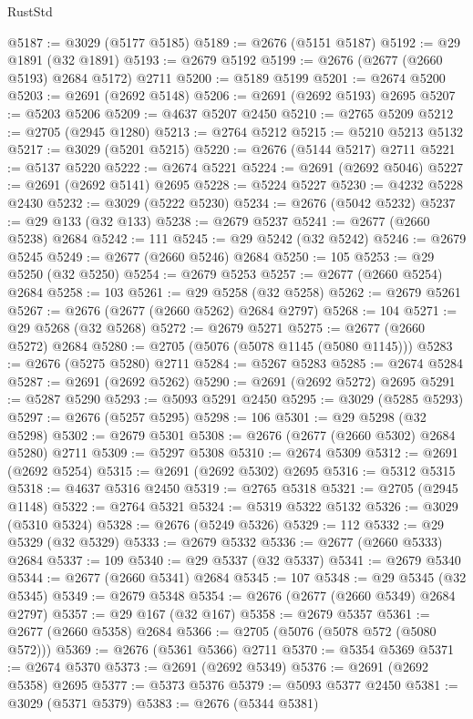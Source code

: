 \begin{lexlean}{RustStd}
\begin{coremodule}
{\begin{coremodule}
{{{{{{{{{{{{{{{{{{{{{{{{{{{{{{{{{{{{{{{{{{{{{{{{{{{{{{{@5187 := @3029 (@5177 @5185)
@5189 := @2676 (@5151 @5187)
@5192 := @29 @1891 (@32 @1891)
@5193 := @2679 @5192
@5199 := @2676 (@2677 (@2660 @5193) @2684 @5172) @2711
@5200 := @5189 @5199
@5201 := @2674 @5200
@5203 := @2691 (@2692 @5148)
@5206 := @2691 (@2692 @5193) @2695
@5207 := @5203 @5206
@5209 := @4637 @5207 @2450
@5210 := @2765 @5209
@5212 := @2705 (@2945 @1280)
@5213 := @2764 @5212
@5215 := @5210 @5213 @5132
@5217 := @3029 (@5201 @5215)
@5220 := @2676 (@5144 @5217) @2711
@5221 := @5137 @5220
@5222 := @2674 @5221
@5224 := @2691 (@2692 @5046)
@5227 := @2691 (@2692 @5141) @2695
@5228 := @5224 @5227
@5230 := @4232 @5228 @2430
@5232 := @3029 (@5222 @5230)
@5234 := @2676 (@5042 @5232)
@5237 := @29 @133 (@32 @133)
@5238 := @2679 @5237
@5241 := @2677 (@2660 @5238) @2684
@5242 := 111
@5245 := @29 @5242 (@32 @5242)
@5246 := @2679 @5245
@5249 := @2677 (@2660 @5246) @2684
@5250 := 105
@5253 := @29 @5250 (@32 @5250)
@5254 := @2679 @5253
@5257 := @2677 (@2660 @5254) @2684
@5258 := 103
@5261 := @29 @5258 (@32 @5258)
@5262 := @2679 @5261
@5267 := @2676 (@2677 (@2660 @5262) @2684 @2797)
@5268 := 104
@5271 := @29 @5268 (@32 @5268)
@5272 := @2679 @5271
@5275 := @2677 (@2660 @5272) @2684
@5280 := @2705 (@5076 (@5078 @1145 (@5080 @1145)))
@5283 := @2676 (@5275 @5280) @2711
@5284 := @5267 @5283
@5285 := @2674 @5284
@5287 := @2691 (@2692 @5262)
@5290 := @2691 (@2692 @5272) @2695
@5291 := @5287 @5290
@5293 := @5093 @5291 @2450
@5295 := @3029 (@5285 @5293)
@5297 := @2676 (@5257 @5295)
@5298 := 106
@5301 := @29 @5298 (@32 @5298)
@5302 := @2679 @5301
@5308 := @2676 (@2677 (@2660 @5302) @2684 @5280) @2711
@5309 := @5297 @5308
@5310 := @2674 @5309
@5312 := @2691 (@2692 @5254)
@5315 := @2691 (@2692 @5302) @2695
@5316 := @5312 @5315
@5318 := @4637 @5316 @2450
@5319 := @2765 @5318
@5321 := @2705 (@2945 @1148)
@5322 := @2764 @5321
@5324 := @5319 @5322 @5132
@5326 := @3029 (@5310 @5324)
@5328 := @2676 (@5249 @5326)
@5329 := 112
@5332 := @29 @5329 (@32 @5329)
@5333 := @2679 @5332
@5336 := @2677 (@2660 @5333) @2684
@5337 := 109
@5340 := @29 @5337 (@32 @5337)
@5341 := @2679 @5340
@5344 := @2677 (@2660 @5341) @2684
@5345 := 107
@5348 := @29 @5345 (@32 @5345)
@5349 := @2679 @5348
@5354 := @2676 (@2677 (@2660 @5349) @2684 @2797)
@5357 := @29 @167 (@32 @167)
@5358 := @2679 @5357
@5361 := @2677 (@2660 @5358) @2684
@5366 := @2705 (@5076 (@5078 @572 (@5080 @572)))
@5369 := @2676 (@5361 @5366) @2711
@5370 := @5354 @5369
@5371 := @2674 @5370
@5373 := @2691 (@2692 @5349)
@5376 := @2691 (@2692 @5358) @2695
@5377 := @5373 @5376
@5379 := @5093 @5377 @2450
@5381 := @3029 (@5371 @5379)
@5383 := @2676 (@5344 @5381)
}}}}}}}}}}}}}}}}}}}}}}}}}}}}}}}}}}}}}}}}}}}}}}}}}}}}}}}
\end{coremodule}}
\end{coremodule}
\end{lexlean}
